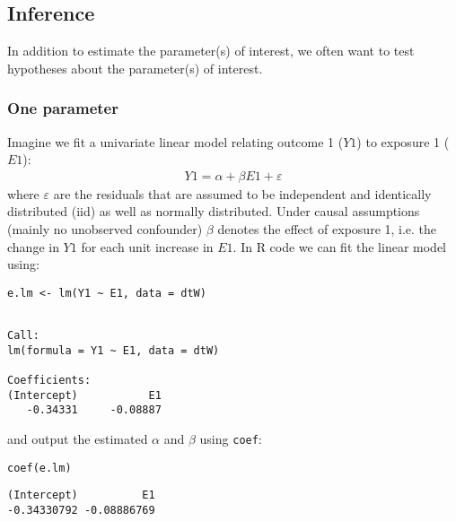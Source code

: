 \documentclass{article}
\begin{document}
\subsection{Inference}
\label{sec:org624ccae}

In addition to estimate the parameter(s) of interest, we often want to
test hypotheses about the parameter(s) of interest. 

\subsubsection{One parameter}
\label{sec:org6878ca7}

Imagine we fit a univariate linear model relating outcome 1 (\(Y1\))
to exposure 1 (\(E1\)):
\begin{align*}
Y1 = \alpha + \beta E1 + \varepsilon
\end{align*}
where \(\varepsilon\) are the residuals that are assumed to be
 independent and identically distributed (iid) as well as normally
 distributed. Under causal assumptions (mainly no unobserved
 confounder) \(\beta\) denotes the effect of exposure 1, i.e. the
 change in \(Y1\) for each unit increase in \(E1\). In R code we can
 fit the linear model using:
\lstset{language=r,label= ,caption= ,captionpos=b,numbers=none}
\begin{lstlisting}
e.lm <- lm(Y1 ~ E1, data = dtW)
\end{lstlisting}

\begin{verbatim}

Call:
lm(formula = Y1 ~ E1, data = dtW)

Coefficients:
(Intercept)           E1  
   -0.34331     -0.08887
\end{verbatim}

and output the estimated \(\alpha\) and \(\beta\) using \texttt{coef}:
\lstset{language=r,label= ,caption= ,captionpos=b,numbers=none}
\begin{lstlisting}
coef(e.lm)
\end{lstlisting}

\begin{verbatim}
(Intercept)          E1 
-0.34330792 -0.08886769
\end{verbatim}
\end{document}
